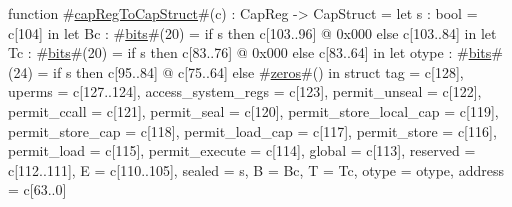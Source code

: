 function #\hyperref[zcapRegToCapStruct]{capRegToCapStruct}#(c) : CapReg -> CapStruct =
  let s : bool  = c[104] in
  let Bc : #\hyperref[zbits]{bits}#(20) = if s then c[103..96] @ 0x000 else c[103..84] in
  let Tc : #\hyperref[zbits]{bits}#(20) = if s then c[83..76] @ 0x000 else c[83..64] in
  let otype : #\hyperref[zbits]{bits}#(24) = if s then c[95..84] @ c[75..64] else #\hyperref[zzzeros]{zeros}#() in
  struct {
    tag                    = c[128],
    uperms                 = c[127..124],
    access_system_regs     = c[123],
    permit_unseal          = c[122],
    permit_ccall           = c[121],
    permit_seal            = c[120],
    permit_store_local_cap = c[119],
    permit_store_cap       = c[118],
    permit_load_cap        = c[117],
    permit_store           = c[116],
    permit_load            = c[115],
    permit_execute         = c[114],
    global                 = c[113],
    reserved               = c[112..111],
    E                      = c[110..105],
    sealed                 = s,
    B                      = Bc,
    T                      = Tc,
    otype                  = otype,
    address                = c[63..0]
  }
